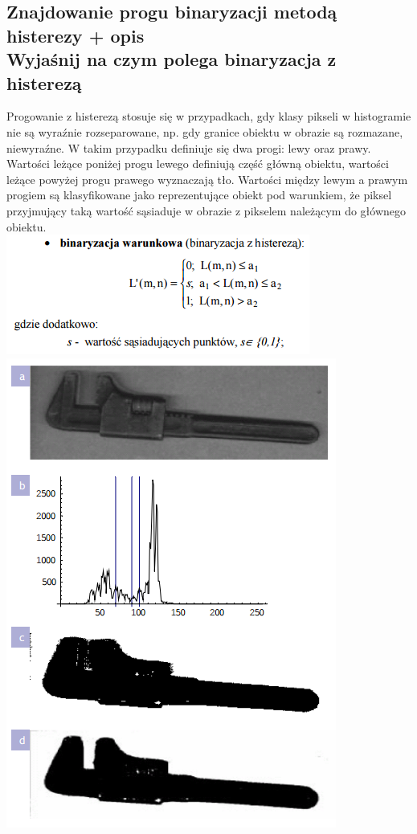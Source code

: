 \documentclass[a4paper, 12pt, titlepage]{article}
\begin{document}
\subsection{Znajdowanie progu binaryzacji metodą histerezy + opis \\ Wyjaśnij na czym polega binaryzacja z histerezą}
Progowanie z histerezą stosuje się w przypadkach, gdy klasy pikseli w histogramie nie są wyraźnie rozseparowane, np. gdy granice obiektu w obrazie są rozmazane, niewyraźne. W takim przypadku definiuje się dwa progi: lewy oraz prawy. Wartości leżące poniżej progu lewego definiują część główną obiektu, wartości leżące powyżej progu prawego wyznaczają tło. Wartości między lewym a prawym progiem są klasyfikowane jako reprezentujące obiekt pod warunkiem, że piksel przyjmujący taką wartość sąsiaduje w obrazie z pikselem należącym do głównego obiektu.\\
\includegraphics[scale=0.8]{Bin_histereza_wzor.png} 
\includegraphics[scale=0.8]{Bin_histereza.png}
\end{document}
